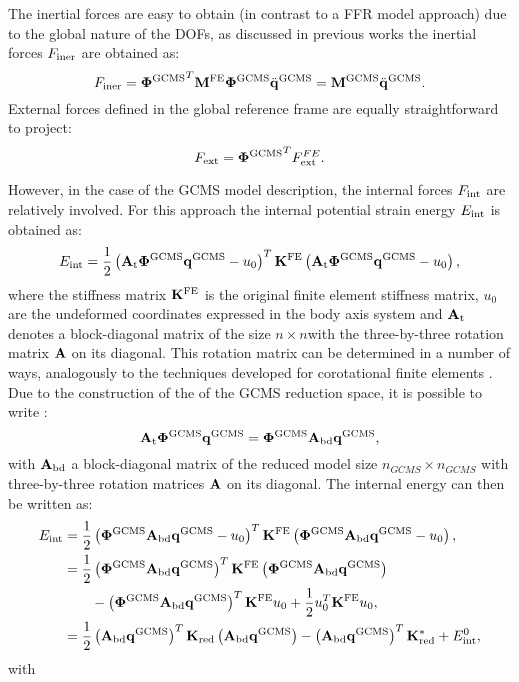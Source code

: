 The inertial forces are easy to obtain (in contrast to a FFR model approach) due to the global nature of the DOFs, as discussed in previous works \cite{pechstein2013} the inertial forces $F_{\mathrm{iner}}$ are obtained as:
\begin{equation}
F_{\mathrm{iner}} = {\bm \Phi^{\rm GCMS}}^T\mathbf M^{\rm FE}\bm \Phi^{\rm GCMS}\ddot{\mathbf q}^{\rm GCMS} = \mathbf M^{\rm GCMS}\ddot{\mathbf q}^{\rm GCMS}.
\end{equation}
External forces defined in the global reference frame are equally straightforward to project:
\begin{equation}
F_{\mathrm{ext}} = {\bm \Phi^{\rm GCMS}}^TF_{\mathrm{ext}}^{FE}. 
\end{equation}

However, in the case of the GCMS model description, the internal forces $F_{\mathrm{int}}$ are relatively involved. For this approach the internal potential strain energy $E_{\mathrm{int}}$ is obtained as:
\begin{equation}
  E_{\mathrm{int}} = \frac{1}{2} \left(\mathbf A_{\mathrm{t}}\bm \Phi^{\rm GCMS}\mathbf q^{\rm GCMS} -u_0\right)^T\mathbf K^{\rm FE}\left(\mathbf A_{\mathrm{t}}\bm \Phi^{\rm GCMS}\mathbf q^{\rm GCMS} -u_0\right) ,
	\label{eq:w_int2}
\end{equation}
where the stiffness matrix $\mathbf K^{\rm FE}$ is the original finite element stiffness matrix, $u_0$ are the undeformed coordinates expressed in the body axis system and $\mathbf A_{\mathrm{t}}$ denotes a block-diagonal matrix of the size $n \times n$with the three-by-three rotation matrix $\mathbf A$ on its diagonal. This rotation matrix can be determined in a number of ways, analogously to the techniques developed for corotational finite elements \cite{Felippa}.  Due to the construction of the of the GCMS reduction space, it is possible to write \cite{gerstmayr2006}:
\begin{equation}
 \mathbf A_{\mathrm{t}}\bm \Phi^{\rm GCMS}\mathbf q^{\rm GCMS} = \bm \Phi^{\rm GCMS}\mathbf A_{\mathrm{bd}}\mathbf q^{\rm GCMS},
\end{equation}
with $\mathbf A_{\mathrm{bd}}$ a block-diagonal matrix of the reduced model size $n_{GCMS} \times n_{GCMS}$ with three-by-three rotation matrices $\mathbf A$ on its diagonal. The internal energy can then be written as:
\begin{eqnarray}
  E_{\mathrm{int}} &= \frac{1}{2} \left(\bm \Phi^{\rm GCMS}\mathbf A_{\mathrm{bd}}\mathbf q^{\rm GCMS} -u_0\right)^T\mathbf K^{\rm FE}\left(\bm \Phi^{\rm GCMS}\mathbf A_{\mathrm{bd}}\mathbf q^{\rm GCMS} -u_0\right) , \\
	&= \frac{1}{2} \left(\bm \Phi^{\rm GCMS}\mathbf A_{\mathrm{bd}}\mathbf q^{\rm GCMS}\right)^T\mathbf K^{\rm FE}\left(\bm \Phi^{\rm GCMS}\mathbf A_{\mathrm{bd}}\mathbf q^{\rm GCMS}\right) \nonumber \\
	& \qquad - \left(\bm \Phi^{\rm GCMS}\mathbf A_{\mathrm{bd}}\mathbf q^{\rm GCMS}\right)^T\mathbf K^{\rm FE} u_0+\frac{1}{2}u_0^T\mathbf K^{\rm FE} u_0 ,\\
	&= \frac{1}{2} \left(\mathbf A_{\mathrm{bd}}\mathbf q^{\rm GCMS}\right)^T\mathbf K_{\rm red}\left(\mathbf A_{\mathrm{bd}}\mathbf q^{\rm GCMS}\right) - \left(\mathbf A_{\mathrm{bd}}\mathbf q^{\rm GCMS}\right)^T\mathbf K_{\rm red}^*+E_{\mathrm{int}}^0,
\end{eqnarray}
with 
